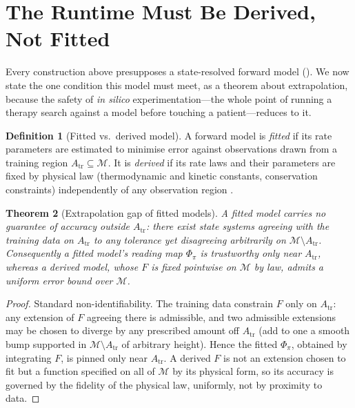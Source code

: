 \documentclass[11pt,a4paper]{article}
\theoremstyle{cfcthm}
\newtheorem{theorem}{Theorem}[section]
\theoremstyle{definition}
\newtheorem{definition}[theorem]{Definition}
\theoremstyle{remark}
\newcommand{\Man}{\mathcal{M}}          %
\newcommand{\probe}{\pi}                %
\newcommand{\fwd}{\Phi}                 %
\begin{document}
\section{The Runtime Must Be Derived, Not Fitted}
\label{sec:runtime}

Every construction above presupposes a state-resolved forward model
(). We now state the one condition this model must
meet, as a theorem about extrapolation, because the safety of \emph{in silico}
experimentation---the whole point of running a therapy search against a model
before touching a patient---reduces to it.

\begin{definition}[Fitted vs.\ derived model]
\label{def:fitvsder}
A forward model is \emph{fitted} if its rate parameters are estimated to
minimise error against observations drawn from a training region
$A_{\mathrm{tr}}\subseteq\Man$. It is \emph{derived} if its rate laws and their
parameters are fixed by physical law (thermodynamic and kinetic constants,
conservation constraints) independently of any observation region
\citep{palsson2015systems,orth2010fba}.
\end{definition}

\begin{theorem}[Extrapolation gap of fitted models]
\label{thm:extrap}
A fitted model carries no guarantee of accuracy outside $A_{\mathrm{tr}}$:
there exist state systems agreeing with the training data on $A_{\mathrm{tr}}$
to any tolerance yet disagreeing arbitrarily on $\Man\setminus A_{\mathrm{tr}}$.
Consequently a fitted model's reading map $\fwd_\probe$ is trustworthy only
near $A_{\mathrm{tr}}$, whereas a derived model, whose $F$ is fixed pointwise on
$\Man$ by law, admits a uniform error bound over $\Man$.
\end{theorem}

\begin{proof}
Standard non-identifiability. The training data constrain $F$ only on
$A_{\mathrm{tr}}$: any extension of $F$ agreeing there is admissible, and two
admissible extensions may be chosen to diverge by any prescribed amount off
$A_{\mathrm{tr}}$ (add to one a smooth bump supported in
$\Man\setminus A_{\mathrm{tr}}$ of arbitrary height). Hence the fitted
$\fwd_\probe$, obtained by integrating $F$, is pinned only near
$A_{\mathrm{tr}}$. A derived $F$ is not an extension chosen to fit but a
function specified on all of $\Man$ by its physical form, so its accuracy is
governed by the fidelity of the physical law, uniformly, not by proximity to
data.
\end{proof}
\end{document}

